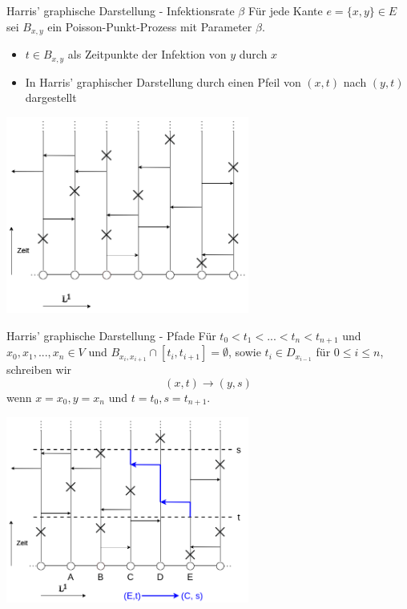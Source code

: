 \documentclass[11pt]{beamer}
\begin{document}
\begin{frame}{Harris' graphische Darstellung - Infektionsrate $\beta$}
    Für jede Kante $e = \{ x, y \} \in E$ sei $B_{x, y}$ ein Poisson-Punkt-Prozess mit Parameter
    $\beta$.
    \begin{itemize}
        \item $t \in B_{x, y}$ als Zeitpunkte der Infektion von $y$ durch $x$
        \item In Harris' graphischer Darstellung durch einen Pfeil von $(x, t)$ nach $(y, t)$
        dargestellt
    \end{itemize}
    \begin{center}
        \includegraphics[width = 0.6\textwidth]{images/contact process arrows.png}
    \end{center}
\end{frame}

\begin{frame}{Harris' graphische Darstellung - Pfade}
    Für $t_0 < t_1 < ... < t_n < t_{n + 1}$ und $x_0, x_1, ..., x_n \in V$
    und $B_{x_i, x_{i + 1}} \cap [t_i, t_{i + 1}] = \emptyset$, sowie $t_i \in D_{x_{i - 1}}$ für
    $0 \leq i \leq n$, schreiben wir 
    \begin{equation*}
        (x, t) \to (y, s)
    \end{equation*}
    wenn $x = x_0, y = x_n$ und $t = t_0, s = t_{n + 1}$.
    \begin{center}
        \includegraphics[width=0.6\textwidth]{images/contact process path.png}
    \end{center}
\end{frame}
\end{document}
